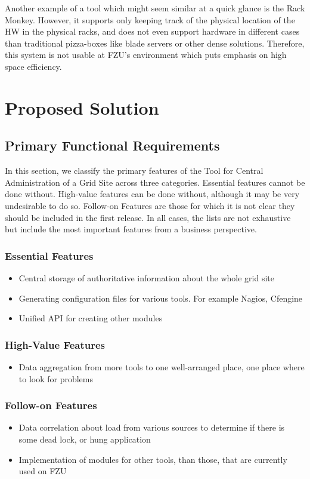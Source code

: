 \documentclass[12pt]{article}
\begin{document}
Another example of a tool which might seem similar at a quick glance is the Rack Monkey.  However, it supports only keeping track
of the physical location of the HW in the physical racks, and does not even support hardware in different cases than traditional
pizza-boxes like blade servers or other dense solutions.  Therefore, this system is not usable at FZU's environment which puts
emphasis on high space efficiency.

\section{Proposed Solution}

\subsection{Primary Functional Requirements}
In this section, we classify the primary features of the Tool for Central Administration of a Grid Site across three categories. 
Essential features cannot be done without. High-value features can be done without, although it may be very undesirable to do so. 
Follow-on Features are those for which it is not clear they should be included in the first release. In all cases, the lists are not 
exhaustive but include the most important features from a business perspective.

\subsubsection{Essential Features}
\begin{itemize}
	\item Central storage of authoritative information about the whole grid site
	\item Generating configuration files for various tools. For example Nagios, Cfengine
	\item Unified API for creating other modules
\end{itemize}

\subsubsection{High-Value Features}
\begin{itemize}
	\item Data aggregation from more tools to one well-arranged place, one place where to look for problems
\end{itemize}

\subsubsection{Follow-on Features}
\begin{itemize}
	\item Data correlation about load from various sources to determine if there is some dead lock, or hung application
	\item Implementation of modules for other tools, than those, that are currently used on FZU
\end{itemize}
\end{document}
